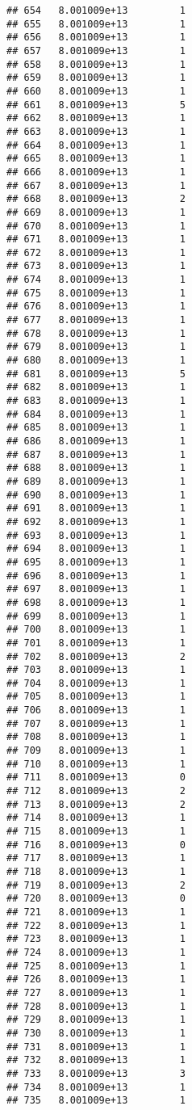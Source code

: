 \documentclass[
]{article}
\begin{document}
\begin{verbatim}
## 654   8.001009e+13         1
## 655   8.001009e+13         1
## 656   8.001009e+13         1
## 657   8.001009e+13         1
## 658   8.001009e+13         1
## 659   8.001009e+13         1
## 660   8.001009e+13         1
## 661   8.001009e+13         5
## 662   8.001009e+13         1
## 663   8.001009e+13         1
## 664   8.001009e+13         1
## 665   8.001009e+13         1
## 666   8.001009e+13         1
## 667   8.001009e+13         1
## 668   8.001009e+13         2
## 669   8.001009e+13         1
## 670   8.001009e+13         1
## 671   8.001009e+13         1
## 672   8.001009e+13         1
## 673   8.001009e+13         1
## 674   8.001009e+13         1
## 675   8.001009e+13         1
## 676   8.001009e+13         1
## 677   8.001009e+13         1
## 678   8.001009e+13         1
## 679   8.001009e+13         1
## 680   8.001009e+13         1
## 681   8.001009e+13         5
## 682   8.001009e+13         1
## 683   8.001009e+13         1
## 684   8.001009e+13         1
## 685   8.001009e+13         1
## 686   8.001009e+13         1
## 687   8.001009e+13         1
## 688   8.001009e+13         1
## 689   8.001009e+13         1
## 690   8.001009e+13         1
## 691   8.001009e+13         1
## 692   8.001009e+13         1
## 693   8.001009e+13         1
## 694   8.001009e+13         1
## 695   8.001009e+13         1
## 696   8.001009e+13         1
## 697   8.001009e+13         1
## 698   8.001009e+13         1
## 699   8.001009e+13         1
## 700   8.001009e+13         1
## 701   8.001009e+13         1
## 702   8.001009e+13         2
## 703   8.001009e+13         1
## 704   8.001009e+13         1
## 705   8.001009e+13         1
## 706   8.001009e+13         1
## 707   8.001009e+13         1
## 708   8.001009e+13         1
## 709   8.001009e+13         1
## 710   8.001009e+13         1
## 711   8.001009e+13         0
## 712   8.001009e+13         2
## 713   8.001009e+13         2
## 714   8.001009e+13         1
## 715   8.001009e+13         1
## 716   8.001009e+13         0
## 717   8.001009e+13         1
## 718   8.001009e+13         1
## 719   8.001009e+13         2
## 720   8.001009e+13         0
## 721   8.001009e+13         1
## 722   8.001009e+13         1
## 723   8.001009e+13         1
## 724   8.001009e+13         1
## 725   8.001009e+13         1
## 726   8.001009e+13         1
## 727   8.001009e+13         1
## 728   8.001009e+13         1
## 729   8.001009e+13         1
## 730   8.001009e+13         1
## 731   8.001009e+13         1
## 732   8.001009e+13         1
## 733   8.001009e+13         3
## 734   8.001009e+13         1
## 735   8.001009e+13         1

\end{verbatim}
\end{document}
